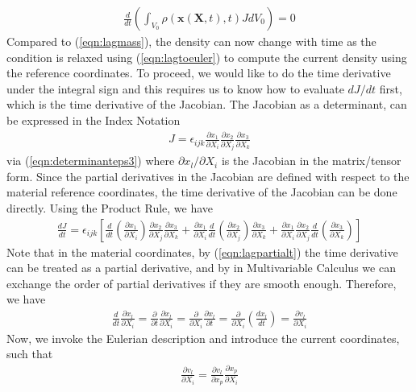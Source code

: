 \begin{align}
\frac{d}{dt}\left(\int_{V_0} \rho(\textbf{x}(\textbf{X},t),t) JdV_0 \right) = 0 \label{eqn:eulermassdt}   
\end{align}
Compared to (\ref{eqn:lagmass}), the density can now change with time as the condition is relaxed using (\ref{eqn:lagtoeuler}) to compute the current density using the reference coordinates. To proceed, we would like to do the time derivative under the integral sign and this requires us to know how to evaluate $dJ/dt$ first, which is the time derivative of the Jacobian. The Jacobian as a determinant, can be expressed in the Index Notation
\begin{align}
J = \epsilon_{ijk} \frac{\partial x_1}{\partial X_i}\frac{\partial x_2}{\partial X_j}\frac{\partial x_3}{\partial X_k} \label{eqn:Jdefn}
\end{align}
via (\ref{eqn:determinanteps3}) where $\partial x_l/\partial X_i$ is the Jacobian in the matrix/tensor form. Since the partial derivatives in the Jacobian are defined with respect to the material reference coordinates, the time derivative of the Jacobian can be done directly. Using the Product Rule, we have
\begin{align}
\frac{dJ}{dt} =  \epsilon_{ijk} \left[\frac{d}{dt}\left(\frac{\partial x_1}{\partial X_i}\right)\frac{\partial x_2}{\partial X_j}\frac{\partial x_3}{\partial X_k} +  \frac{\partial x_1}{\partial X_i}\frac{d}{dt}\left(\frac{\partial x_2}{\partial X_j}\right)\frac{\partial x_3}{\partial X_k} + \frac{\partial x_1}{\partial X_i}\frac{\partial x_2}{\partial X_j}\frac{d}{dt}\left(\frac{\partial x_3}{\partial X_k}\right)\right]
\label{eqn:dJdt1}
\end{align}
Note that in the material coordinates, by (\ref{eqn:lagpartialt}) the time derivative can be treated as a partial derivative, and by  in Multivariable Calculus we can exchange the order of partial derivatives if they are smooth enough. Therefore, we have
\begin{align}
\frac{d}{dt}\frac{\partial x_l}{\partial X_i} = \frac{\partial}{\partial t}\frac{\partial x_l}{\partial X_i} = \frac{\partial}{\partial X_i}\frac{\partial x_l}{\partial t} = \frac{\partial}{\partial X_i}\left(\frac{d x_l}{dt}\right) = \frac{\partial v_l}{\partial X_i}
\end{align}
Now, we invoke the Eulerian description and introduce the current coordinates, such that
\begin{align}
\frac{\partial v_l}{\partial X_i} = \frac{\partial v_l}{\partial x_p}\frac{\partial x_p}{\partial X_i}
\end{align}

